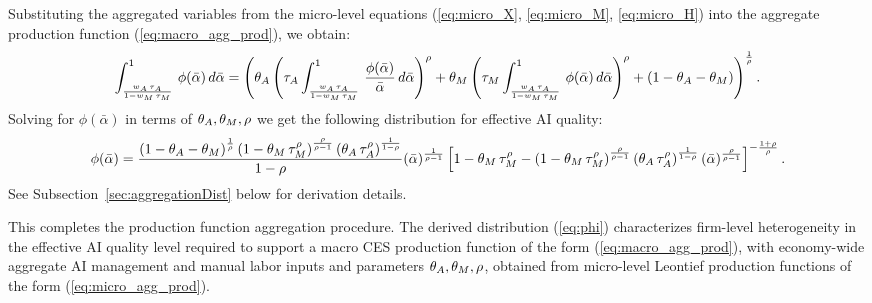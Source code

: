 Substituting the aggregated variables from the micro-level equations (\ref{eq:micro_X}, \ref{eq:micro_M}, \ref{eq:micro_H}) into the aggregate production function (\ref{eq:macro_agg_prod}), we obtain:
\begin{equation}
\int_{\frac{w_{A}\,\tau_{A}}{1 - w_{M}\,\tau_{M}}}^{1}\,\phi(\bar{\alpha})\,d\bar{\alpha}
=
\left(
\theta_{A}\left(\tau_{A}\int_{\frac{w_{A}\,\tau_{A}}{1 - w_{M}\,\tau_{M}}}^{1}\,\frac{\phi(\bar{\alpha})}{\bar{\alpha}}\,d\bar{\alpha}\right)^{\rho}
+
\theta_{M} \left(\tau_{M}\int_{\frac{w_{A}\,\tau_{A}}{1 - w_{M}\,\tau_{M}}}^{1}\,\phi(\bar{\alpha})\,d\bar{\alpha}\right)^{\rho}
+
\left(1-\theta_{A}-\theta_{M}\right)
\right)^{\frac{1}{\rho}}.
\label{eq:macro_agg_prod_with_micro_aggregates}
\end{equation}
Solving for $\phi(\bar{\alpha})$ in terms of \( \theta_{A}, \theta_{M}, \rho \) we get the following  distribution for effective AI quality:
\begin{equation}
\phi(\bar{\alpha})=\frac{\left(1-\theta_{A}-\theta_{M}\right)^{\frac{1}{\rho}}\left(1-\theta_{M}\,\tau_{M}^{\rho}\right)^{\frac{\rho}{\rho-1}}\left(\theta_{A}\,\tau_{A}^{\rho}\right)^{\frac{1}{1-\rho}}}{1-\rho}(\bar{\alpha})^{\frac{1}{\rho-1}}\left[1-\theta_{M}\,\tau_{M}^{\rho}-\left(1-\theta_{M}\,\tau_{M}^{\rho}\right)^{\frac{\rho}{\rho-1}}\left(\theta_{A}\,\tau_{A}^{\rho}\right)^{\frac{1}{1-\rho}}(\bar{\alpha})^{\frac{\rho}{\rho-1}}\right]^{-\frac{1+\rho}{\rho}}.\label{eq:phi}
\end{equation}
See Subsection~\ref{sec:aggregationDist} below for derivation details.

This completes the production function aggregation procedure.
The derived distribution (\ref{eq:phi}) characterizes firm-level heterogeneity in the effective AI quality level required to support a macro CES production function of the form (\ref{eq:macro_agg_prod}), with economy-wide aggregate AI management and manual labor inputs and parameters $\theta_{A}, \theta_{M}, \rho$, obtained from micro-level Leontief production functions of the form (\ref{eq:micro_agg_prod}).


